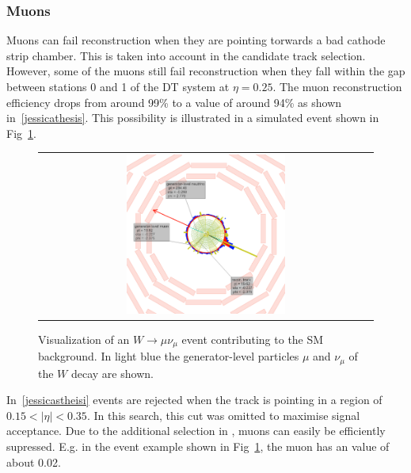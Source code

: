 \subsubsection*{Muons}
Muons can fail reconstruction when they are pointing torwards a bad cathode strip chamber.
This is taken into account in the candidate track selection.
However, some of the muons still fail reconstruction when they fall within the gap between stations 0 and 1 of the DT system at $\eta=0.25$.
The muon reconstruction efficiency drops from around 99\% to a value of around 94\% as shown in~\ref{jessicathesis}. 
This possibility is illustrated in a simulated event shown in Fig~\ref{fig:LostMuon}.
\begin{figure}[!tb]
  \centering 
  \begin{tabular}{c}
    \includegraphics[width=0.49\textwidth]{figures/analysis/LostMuon_Lumi_357583_Event_142918834.png}
  \end{tabular}
  \caption{Visualization of an $W\rightarrow \mu\nu_{\mu}$ event contributing to the SM background. 
           In light blue the generator-level particles $\mu$ and $\nu_{\mu}$ of the $W$ decay are shown. }
  \label{fig:LostMuon}
\end{figure}
In~\ref{jessicastheisi} events are rejected when the track is pointing in a region of $0.15<|\eta|<0.35$.
In this search, this cut was omitted to maximise signal acceptance. 
Due to the additional selection in \ias, muons can easily be efficiently supressed.
E.g. in the event example shown in Fig~\ref{fig:LostMuon}, the muon has an \ias value of about 0.02.\\


